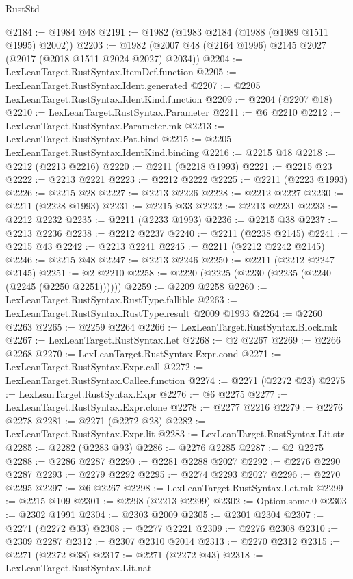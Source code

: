 \begin{lexlean}{RustStd}
\begin{coremodule}
@2184 := @1984 @48
@2191 := @1982 (@1983 @2184 (@1988 (@1989 @1511 @1995) @2002))
@2203 := @1982 (@2007 @48 (@2164 @1996) @2145 @2027 (@2017 (@2018 @1511 @2024 @2027) @2034))
@2204 := LexLeanTarget.RustSyntax.ItemDef.function
@2205 := LexLeanTarget.RustSyntax.Ident.generated
@2207 := @2205 LexLeanTarget.RustSyntax.IdentKind.function
@2209 := @2204 (@2207 @18)
@2210 := LexLeanTarget.RustSyntax.Parameter
@2211 := @6 @2210
@2212 := LexLeanTarget.RustSyntax.Parameter.mk
@2213 := LexLeanTarget.RustSyntax.Pat.bind
@2215 := @2205 LexLeanTarget.RustSyntax.IdentKind.binding
@2216 := @2215 @18
@2218 := @2212 (@2213 @2216)
@2220 := @2211 (@2218 @1993)
@2221 := @2215 @23
@2222 := @2213 @2221
@2223 := @2212 @2222
@2225 := @2211 (@2223 @1993)
@2226 := @2215 @28
@2227 := @2213 @2226
@2228 := @2212 @2227
@2230 := @2211 (@2228 @1993)
@2231 := @2215 @33
@2232 := @2213 @2231
@2233 := @2212 @2232
@2235 := @2211 (@2233 @1993)
@2236 := @2215 @38
@2237 := @2213 @2236
@2238 := @2212 @2237
@2240 := @2211 (@2238 @2145)
@2241 := @2215 @43
@2242 := @2213 @2241
@2245 := @2211 (@2212 @2242 @2145)
@2246 := @2215 @48
@2247 := @2213 @2246
@2250 := @2211 (@2212 @2247 @2145)
@2251 := @2 @2210
@2258 := @2220 (@2225 (@2230 (@2235 (@2240 (@2245 (@2250 @2251))))))
@2259 := @2209 @2258
@2260 := LexLeanTarget.RustSyntax.RustType.fallible
@2263 := LexLeanTarget.RustSyntax.RustType.result @2009 @1993
@2264 := @2260 @2263
@2265 := @2259 @2264
@2266 := LexLeanTarget.RustSyntax.Block.mk
@2267 := LexLeanTarget.RustSyntax.Let
@2268 := @2 @2267
@2269 := @2266 @2268
@2270 := LexLeanTarget.RustSyntax.Expr.cond
@2271 := LexLeanTarget.RustSyntax.Expr.call
@2272 := LexLeanTarget.RustSyntax.Callee.function
@2274 := @2271 (@2272 @23)
@2275 := LexLeanTarget.RustSyntax.Expr
@2276 := @6 @2275
@2277 := LexLeanTarget.RustSyntax.Expr.clone
@2278 := @2277 @2216
@2279 := @2276 @2278
@2281 := @2271 (@2272 @28)
@2282 := LexLeanTarget.RustSyntax.Expr.lit
@2283 := LexLeanTarget.RustSyntax.Lit.str
@2285 := @2282 (@2283 @93)
@2286 := @2276 @2285
@2287 := @2 @2275
@2288 := @2286 @2287
@2290 := @2281 @2288 @2027
@2292 := @2276 @2290 @2287
@2293 := @2279 @2292
@2295 := @2274 @2293 @2027
@2296 := @2270 @2295
@2297 := @6 @2267
@2298 := LexLeanTarget.RustSyntax.Let.mk
@2299 := @2215 @109
@2301 := @2298 (@2213 @2299)
@2302 := Option.some.{0}
@2303 := @2302 @1991
@2304 := @2303 @2009
@2305 := @2301 @2304
@2307 := @2271 (@2272 @33)
@2308 := @2277 @2221
@2309 := @2276 @2308
@2310 := @2309 @2287
@2312 := @2307 @2310 @2014
@2313 := @2270 @2312
@2315 := @2271 (@2272 @38)
@2317 := @2271 (@2272 @43)
@2318 := LexLeanTarget.RustSyntax.Lit.nat

\end{coremodule}
\end{lexlean}
